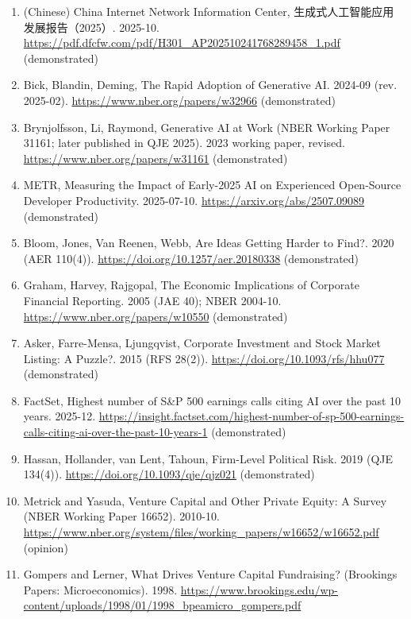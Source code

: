 \documentclass[10pt,letterpaper]{article}
\begin{document}
\begin{enumerate}
  令和7年版情報通信白書 (Information and Communications White Paper
  2025), data tables, in Japanese. 2025.
  \url{https://www.soumu.go.jp/johotsusintokei/whitepaper/ja/r07/html/nd112220.html}
  (demonstrated)
\item
  (Chinese) China Internet Network Information Center,
  生成式人工智能应用发展报告（2025）. 2025-10.
  \url{https://pdf.dfcfw.com/pdf/H301_AP202510241768289458_1.pdf}
  (demonstrated)
\item
  Bick, Blandin, Deming, The Rapid Adoption of Generative AI. 2024-09
  (rev. 2025-02). \url{https://www.nber.org/papers/w32966}
  (demonstrated)
\item
  Brynjolfsson, Li, Raymond, Generative AI at Work (NBER Working Paper
  31161; later published in QJE 2025). 2023 working paper, revised.
  \url{https://www.nber.org/papers/w31161} (demonstrated)
\item
  METR, Measuring the Impact of Early-2025 AI on Experienced Open-Source
  Developer Productivity. 2025-07-10.
  \url{https://arxiv.org/abs/2507.09089} (demonstrated)
\item
  Bloom, Jones, Van Reenen, Webb, Are Ideas Getting Harder to Find?.
  2020 (AER 110(4)). \url{https://doi.org/10.1257/aer.20180338}
  (demonstrated)
\item
  Graham, Harvey, Rajgopal, The Economic Implications of Corporate
  Financial Reporting. 2005 (JAE 40); NBER 2004-10.
  \url{https://www.nber.org/papers/w10550} (demonstrated)
\item
  Asker, Farre-Mensa, Ljungqvist, Corporate Investment and Stock Market
  Listing: A Puzzle?. 2015 (RFS 28(2)).
  \url{https://doi.org/10.1093/rfs/hhu077} (demonstrated)
\item
  FactSet, Highest number of S\&P 500 earnings calls citing AI over the
  past 10 years. 2025-12.
  \url{https://insight.factset.com/highest-number-of-sp-500-earnings-calls-citing-ai-over-the-past-10-years-1}
  (demonstrated)
\item
  Hassan, Hollander, van Lent, Tahoun, Firm-Level Political Risk. 2019
  (QJE 134(4)). \url{https://doi.org/10.1093/qje/qjz021} (demonstrated)
\item
  Metrick and Yasuda, Venture Capital and Other Private Equity: A Survey
  (NBER Working Paper 16652). 2010-10.
  \url{https://www.nber.org/system/files/working_papers/w16652/w16652.pdf}
  (opinion)
\item
  Gompers and Lerner, What Drives Venture Capital Fundraising?
  (Brookings Papers: Microeconomics). 1998.
  \url{https://www.brookings.edu/wp-content/uploads/1998/01/1998_bpeamicro_gompers.pdf}

\end{enumerate}
\end{document}
